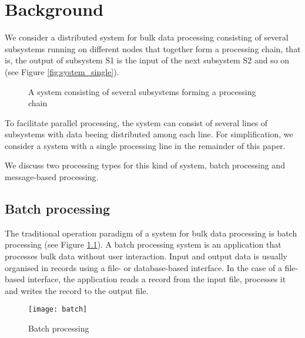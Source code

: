 \chapter{Background}\label{ch:background}
We consider a distributed system for bulk data processing consisting of several subsystems running on different nodes that together form a processing chain, that is, the output of subsystem S1 is the input of the next subsystem S2 and so on (see Figure \ref{fig:system_single}).
\begin{figure}[h!]
	\centering
	\mbox{}
	\mbox{}
	\caption{A system consisting of several subsystems forming a processing chain}
\end{figure}

To facilitate parallel processing, the system can consist of several lines of subsystems with data beeing distributed among each line. For simplification, we consider a system with a single processing line in the remainder of this paper.

We discuss two processing types for this kind of system, batch processing and message-based processing.

\section{Batch processing}\label{sec:batch_processing}
The traditional operation paradigm of a system for bulk data processing is batch processing (see Figure \ref{fig:batch_processing}). A batch processing system is an application that processes bulk data without user interaction. Input and output data is usually organised in records using a file- or database-based interface. In the case of a file-based interface, the application reads a record from the input file, processes it and writes the record to the output file.
\begin{figure}[h!]
	\centering
	\texttt{[image: batch]}
	\caption{Batch processing}
	\label{fig:batch_processing}
\end{figure}

